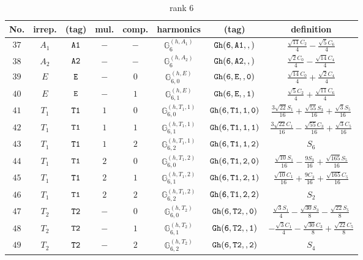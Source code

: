 \documentclass[fleqn,8pt]{jsarticle}
\begin{document}
\begin{table}[ht!]
\begin{center}
\caption{rank 6}
\renewcommand{\arraystretch}{1.3}
\begin{tabular}{cccccccc} \hline \hline
No. & irrep. & (tag) & mul. & comp. & harmonics & (tag) & definition \\ \hline
$ 37 $ & $ A_{1} $ & $ {\tt A1} $ & $ - $ & $ - $ & $ \mathbb{G}_{6}^{(h,A_{1})} $ & $ {\tt Gh(6,A1,,)} $ & $ \frac{\sqrt{11} C_{2}}{4} - \frac{\sqrt{5} C_{6}}{4} $ \\
$ 38 $ & $ A_{2} $ & $ {\tt A2} $ & $ - $ & $ - $ & $ \mathbb{G}_{6}^{(h,A_{2})} $ & $ {\tt Gh(6,A2,,)} $ & $ \frac{\sqrt{2} C_{0}}{4} - \frac{\sqrt{14} C_{4}}{4} $ \\
$ 39 $ & $ E $ & $ {\tt E} $ & $ - $ & $ 0 $ & $ \mathbb{G}_{6,0}^{(h,E)} $ & $ {\tt Gh(6,E,,0)} $ & $ \frac{\sqrt{14} C_{0}}{4} + \frac{\sqrt{2} C_{4}}{4} $ \\
$ 40 $ & $ E $ & $ {\tt E} $ & $ - $ & $ 1 $ & $ \mathbb{G}_{6,1}^{(h,E)} $ & $ {\tt Gh(6,E,,1)} $ & $ \frac{\sqrt{5} C_{2}}{4} + \frac{\sqrt{11} C_{6}}{4} $ \\
$ 41 $ & $ T_{1} $ & $ {\tt T1} $ & $ 1 $ & $ 0 $ & $ \mathbb{G}_{6,0}^{(h,T_{1},1)} $ & $ {\tt Gh(6,T1,1,0)} $ & $ \frac{3 \sqrt{22} S_{1}}{16} + \frac{\sqrt{55} S_{3}}{16} + \frac{\sqrt{3} S_{5}}{16} $ \\
$ 42 $ & $ T_{1} $ & $ {\tt T1} $ & $ 1 $ & $ 1 $ & $ \mathbb{G}_{6,1}^{(h,T_{1},1)} $ & $ {\tt Gh(6,T1,1,1)} $ & $ \frac{3 \sqrt{22} C_{1}}{16} - \frac{\sqrt{55} C_{3}}{16} + \frac{\sqrt{3} C_{5}}{16} $ \\
$ 43 $ & $ T_{1} $ & $ {\tt T1} $ & $ 1 $ & $ 2 $ & $ \mathbb{G}_{6,2}^{(h,T_{1},1)} $ & $ {\tt Gh(6,T1,1,2)} $ & $ S_{6} $ \\
$ 44 $ & $ T_{1} $ & $ {\tt T1} $ & $ 2 $ & $ 0 $ & $ \mathbb{G}_{6,0}^{(h,T_{1},2)} $ & $ {\tt Gh(6,T1,2,0)} $ & $ \frac{\sqrt{10} S_{1}}{16} - \frac{9 S_{3}}{16} + \frac{\sqrt{165} S_{5}}{16} $ \\
$ 45 $ & $ T_{1} $ & $ {\tt T1} $ & $ 2 $ & $ 1 $ & $ \mathbb{G}_{6,1}^{(h,T_{1},2)} $ & $ {\tt Gh(6,T1,2,1)} $ & $ \frac{\sqrt{10} C_{1}}{16} + \frac{9 C_{3}}{16} + \frac{\sqrt{165} C_{5}}{16} $ \\
$ 46 $ & $ T_{1} $ & $ {\tt T1} $ & $ 2 $ & $ 2 $ & $ \mathbb{G}_{6,2}^{(h,T_{1},2)} $ & $ {\tt Gh(6,T1,2,2)} $ & $ S_{2} $ \\
$ 47 $ & $ T_{2} $ & $ {\tt T2} $ & $ - $ & $ 0 $ & $ \mathbb{G}_{6,0}^{(h,T_{2})} $ & $ {\tt Gh(6,T2,,0)} $ & $ \frac{\sqrt{3} S_{1}}{4} - \frac{\sqrt{30} S_{3}}{8} - \frac{\sqrt{22} S_{5}}{8} $ \\
$ 48 $ & $ T_{2} $ & $ {\tt T2} $ & $ - $ & $ 1 $ & $ \mathbb{G}_{6,1}^{(h,T_{2})} $ & $ {\tt Gh(6,T2,,1)} $ & $ - \frac{\sqrt{3} C_{1}}{4} - \frac{\sqrt{30} C_{3}}{8} + \frac{\sqrt{22} C_{5}}{8} $ \\
$ 49 $ & $ T_{2} $ & $ {\tt T2} $ & $ - $ & $ 2 $ & $ \mathbb{G}_{6,2}^{(h,T_{2})} $ & $ {\tt Gh(6,T2,,2)} $ & $ S_{4} $ \\
 \hline \hline
\end{tabular}
\end{center}
\end{table}
\end{document}
